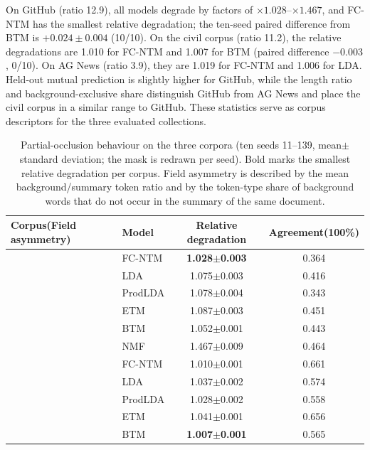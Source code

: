 \documentclass[pdflatex,sn-basic]{sn-jnl}
\newcommand{\fcntm}{FC-NTM}
\begin{document}
On GitHub (ratio 12.9), all models degrade by factors of $\times1.028$--$\times1.467$, and
\fcntm{} has the smallest relative degradation; the ten-seed paired difference from BTM is
$+0.024\pm0.004$ (10/10). On the civil corpus (ratio 11.2), the relative degradations are 1.010
for \fcntm{} and 1.007 for BTM (paired difference $-0.003$, 0/10). On AG News (ratio 3.9), they
are 1.019 for \fcntm{} and 1.006 for LDA. Held-out mutual prediction is slightly higher for
GitHub, while the length ratio and background-exclusive share distinguish GitHub from AG News and
place the civil corpus in a similar range to GitHub. These statistics serve as corpus descriptors
for the three evaluated collections.

\begin{table}[t]
\centering
\caption{Partial-occlusion behaviour on the three corpora (ten seeds 11--139, mean$\pm$standard deviation; the mask is redrawn per seed). Bold marks the smallest relative degradation per corpus. Field asymmetry is described by the mean background/summary token ratio and by the token-type share of background words that do not occur in the summary of the same document.}
\label{tab:occl-cross}
\footnotesize
\setlength{\tabcolsep}{3pt}
\begin{tabular}{@{}llcc@{}}
\toprule
Corpus(Field asymmetry) & Model & Relative degradation & Agreement(100\%) \\
\midrule
{}
 & \fcntm{} & \textbf{1.028$\pm$0.003} & 0.364 \\
 & LDA & 1.075$\pm$0.003 & 0.416 \\
 & ProdLDA & 1.078$\pm$0.004 & 0.343 \\
 & ETM & 1.087$\pm$0.003 & 0.451 \\
 & BTM & 1.052$\pm$0.001 & 0.443 \\
 & NMF & 1.467$\pm$0.009 & 0.464 \\
\midrule
{}
 & \fcntm{} & 1.010$\pm$0.001 & 0.661 \\
 & LDA & 1.037$\pm$0.002 & 0.574 \\
 & ProdLDA & 1.028$\pm$0.002 & 0.558 \\
 & ETM & 1.041$\pm$0.001 & 0.656 \\
 & BTM & \textbf{1.007$\pm$0.001} & 0.565 \\

\end{tabular}
\end{table}
\end{document}
